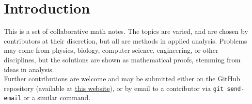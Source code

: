 \documentclass[../main.tex]{subfiles}
\begin{document}
\section{Introduction}

This is a set of collaborative math notes.
The topics are varied, and are chosen by contributors at their discretion, but all are methods in applied analysis.
Problems may come from physics, biology, computer science, engineering, or other disciplines, but the solutions are shown as mathematical proofs, stemming from ideas in analysis. \\

Further contributions are welcome and may be submitted either on the GitHub repository (available at \href{https://github.com/samueltwallace/AppliedAnalysis}{this website}), or by email to a contributor via \texttt{git send-email} or a similar command. 
\end{document}
